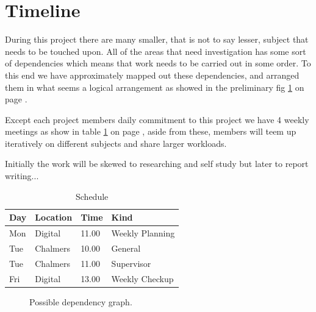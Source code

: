 \newpage
\section{Timeline}
During this project there are many smaller, that is not to say lesser, subject that needs to be touched upon. All of the areas that need investigation has some sort of dependencies which means that work needs to be carried out in some order. To this end we have approximately mapped out these dependencies, and arranged them in what seems a logical arrangement as showed in the preliminary fig \ref{fig:dependency_graph} on page \pageref{fig:dependency_graph}.   

Except each project members daily commitment to this project we have 4 weekly meetings as show in table \ref{tab:schedule} on page \pageref{tab:schedule}, aside from these, members will teem up iteratively on different subjects and share larger workloads.  

Initially the work will be skewed to researching and self study but later to report writing...

\begin{table}[]
\centering
\begin{tabular}{llll}
\hline
Day & Location & Time  & Kind            \\ \hline
Mon & Digital  & 11.00 & Weekly Planning \\
Tue & Chalmers & 10.00 & General         \\
Tue & Chalmers & 11.00 & Supervisor      \\
Fri & Digital  & 13.00 & Weekly Checkup 
\end{tabular}
\caption{Schedule}
\label{tab:schedule}
\end{table}


\begin{figure}
  \caption{Possible dependency graph.}
  \label{fig:dependency_graph}
\end{figure}




